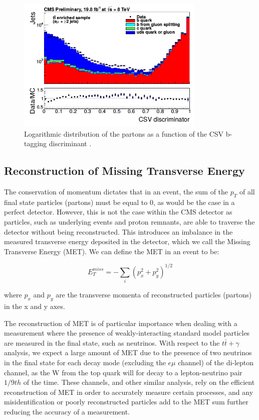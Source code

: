 \begin{figure} \label{fig-CSVDiscriminator}
\begin{center}
\includegraphics[width=0.8\textwidth]{Figures/CSVDiscriminator.png}
\caption{Logarithmic distribution of the partons as a function of the CSV b-tagging discriminant \cite{PhilThesis}.}
\end{center}
\end{figure}


\subsection{Reconstruction of Missing Transverse Energy} \label{subsec-METReco}

The conservation of momentum dictates that in an event, the sum of the $p_T$ of all final state particles (partons) must be equal to 0, as would be the case in a perfect detector. However, this is not the case within the CMS detector as particles, such as underlying events and proton remnants, are able to traverse the detector without being reconstructed. This introduces an imbalance in the measured transverse energy deposited in the detector, which we call the Missing Transverse Energy (MET). We can define the MET in an event to be:

\begin{equation}
E^{miss}_T = - \sum_i(p^2_x + p^2_y)^{1/2}
\end{equation}

where $p_x$ and $p_y$ are the transverse momenta of reconstructed particles (partons) in the x and y axes.

The reconstruction of MET is of particular importance when dealing with a measurement where the presence of weakly-interacting standard model particles are measured in the final state, such as neutrinos.  With respect to the $t\bar{t}+\gamma$ analysis, we expect a large amount of MET due to the presence of two neutrinos in the final state for each decay mode (excluding the $e\mu$ channel) of the di-lepton channel, as the W from the top quark will for decay to a lepton-neutrino pair $1/9th$ of the time. These channels, and other similar analysis, rely on the efficient reconstruction of MET in order to accurately measure certain processes, and any misidentification or poorly reconstructed particles add to the MET sum further reducing the accuracy of a measurement.  

